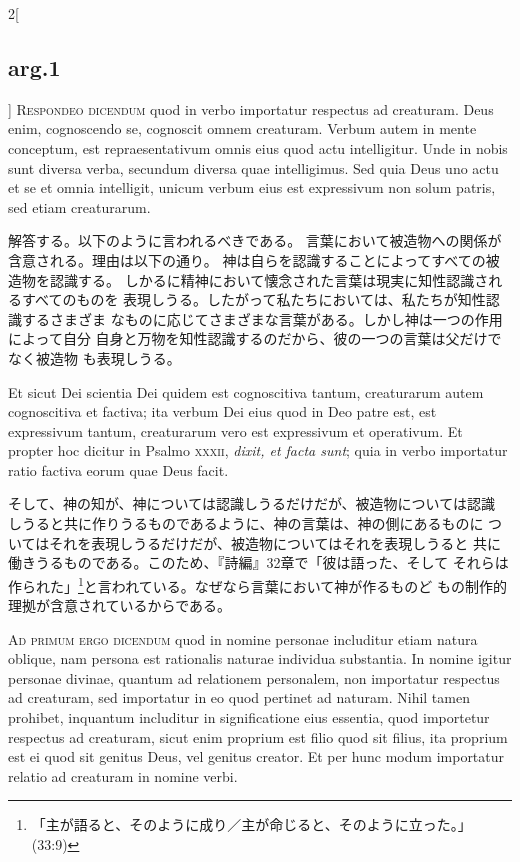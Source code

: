 \documentclass[paper=a4paper,fontsize=10pt,jafontsize=9pt,titlepage]{jlreq}
\begin{document}
\begin{paracol}{2}[\subsection{arg.1}]
{\scshape Respondeo dicendum} quod in verbo importatur respectus ad
creaturam. Deus enim, cognoscendo se, cognoscit omnem
creaturam. Verbum autem in mente conceptum, est repraesentativum omnis
eius quod actu intelligitur. Unde in nobis sunt diversa verba,
secundum diversa quae intelligimus. Sed quia Deus uno actu et se et
omnia intelligit, unicum verbum eius est expressivum non solum patris,
sed etiam creaturarum.

\switchcolumn

解答する。以下のように言われるべきである。
言葉において被造物への関係が含意される。理由は以下の通り。
神は自らを認識することによってすべての被造物を認識する。
しかるに精神において懐念された言葉は現実に知性認識されるすべてのものを
 表現しうる。したがって私たちにおいては、私たちが知性認識するさまざま
 なものに応じてさまざまな言葉がある。しかし神は一つの作用によって自分
 自身と万物を知性認識するのだから、彼の一つの言葉は父だけでなく被造物
 も表現しうる。

\switchcolumn*

Et sicut Dei scientia Dei quidem est
cognoscitiva tantum, creaturarum autem cognoscitiva et factiva; ita
verbum Dei eius quod in Deo patre est, est expressivum tantum,
creaturarum vero est expressivum et operativum. Et propter hoc dicitur
in Psalmo {\scshape xxxii}, {\itshape dixit, et facta sunt}; quia in verbo importatur ratio
factiva eorum quae Deus facit.

\switchcolumn

そして、神の知が、神については認識しうるだけだが、被造物については認識
 しうると共に作りうるものであるように、神の言葉は、神の側にあるものに
 ついてはそれを表現しうるだけだが、被造物についてはそれを表現しうると
 共に働きうるものである。このため、『詩編』32章で「彼は語った、そして
 それらは作られた」\footnote{「主が語ると、そのように成り／主が命じると、そのように立った。」(33:9)}と言われている。なぜなら言葉において神が作るものど
 もの制作的理拠が含意されているからである。

\switchcolumn*[\subsection{ad.1}]

{\scshape Ad primum ergo dicendum} quod in nomine personae includitur etiam
natura oblique, nam persona est rationalis naturae individua
substantia. In nomine igitur personae divinae, quantum ad relationem
personalem, non importatur respectus ad creaturam, sed importatur in
eo quod pertinet ad naturam. Nihil tamen prohibet, inquantum
includitur in significatione eius essentia, quod importetur respectus
ad creaturam, sicut enim proprium est filio quod sit filius, ita
proprium est ei quod sit genitus Deus, vel genitus creator. Et per
hunc modum importatur relatio ad creaturam in nomine verbi.


\end{paracol}
\end{document}
